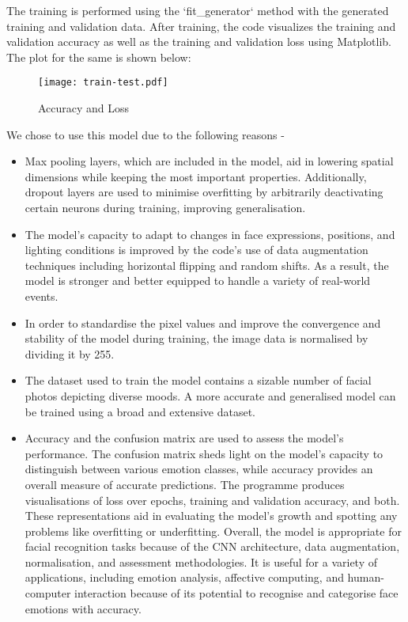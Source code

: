 \documentclass[11pt]{article}
\begin{document}
The training is performed using the `fit\_generator` method with the generated training and validation data. After training, the code visualizes the training and validation accuracy as well as the training and validation loss using Matplotlib.
The plot for the same is shown below:
\begin{figure}[H]
    \centering
    \texttt{[image: train-test.pdf]}
    \caption{Accuracy and Loss}
    \label{fig:enter-label}
\end{figure}
We chose to use this model due to the following reasons - 
\begin{itemize}
    \item Max pooling layers, which are included in the model, aid in lowering spatial dimensions while keeping the most important properties. Additionally, dropout layers are used to minimise overfitting by arbitrarily deactivating certain neurons during training, improving generalisation.
    \item The model's capacity to adapt to changes in face expressions, positions, and lighting conditions is improved by the code's use of data augmentation techniques including horizontal flipping and random shifts. As a result, the model is stronger and better equipped to handle a variety of real-world events.
    \item In order to standardise the pixel values and improve the convergence and stability of the model during training, the image data is normalised by dividing it by 255.
    \item The dataset used to train the model contains a sizable number of facial photos depicting diverse moods. A more accurate and generalised model can be trained using a broad and extensive dataset.
    \item Accuracy and the confusion matrix are used to assess the model's performance. The confusion matrix sheds light on the model's capacity to distinguish between various emotion classes, while accuracy provides an overall measure of accurate predictions.
The programme produces visualisations of loss over epochs, training and validation accuracy, and both. These representations aid in evaluating the model's growth and spotting any problems like overfitting or underfitting.
Overall, the model is appropriate for facial recognition tasks because of the CNN architecture, data augmentation, normalisation, and assessment methodologies. It is useful for a variety of applications, including emotion analysis, affective computing, and human-computer interaction because of its potential to recognise and categorise face emotions with accuracy.

\end{itemize}
\end{document}
